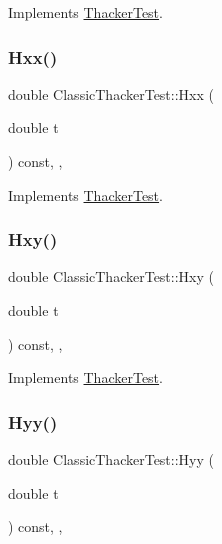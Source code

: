 Implements \hyperlink{classThackerTest_a9a8565b3a9e9bf1e56407d2844bd8517}{Thacker\+Test}.

\mbox{\label{classClassicThackerTest_a5c802e8ef039c0620dc2908987c9097e}} 
\subsubsection{\texorpdfstring{Hxx()}{Hxx()}}
{\footnotesize\ttfamily double Classic\+Thacker\+Test\+::\+Hxx (\begin{DoxyParamCaption}\item[{double}]{t }\end{DoxyParamCaption}) const\hspace{0.3cm}{\ttfamily [inline]}, {\ttfamily [override]}, {\ttfamily [virtual]}}



Implements \hyperlink{classThackerTest_a137a136dd1261b4a97a63831841d611b}{Thacker\+Test}.

\mbox{\label{classClassicThackerTest_adc43007df549bdb1d2ac940199740157}} 
\subsubsection{\texorpdfstring{Hxy()}{Hxy()}}
{\footnotesize\ttfamily double Classic\+Thacker\+Test\+::\+Hxy (\begin{DoxyParamCaption}\item[{double}]{t }\end{DoxyParamCaption}) const\hspace{0.3cm}{\ttfamily [inline]}, {\ttfamily [override]}, {\ttfamily [virtual]}}



Implements \hyperlink{classThackerTest_a309f6008f53c7084163ce52cd381efc7}{Thacker\+Test}.

\mbox{\label{classClassicThackerTest_a6c632dcd0ae4f38dd2e9e69282281df5}} 
\subsubsection{\texorpdfstring{Hyy()}{Hyy()}}
{\footnotesize\ttfamily double Classic\+Thacker\+Test\+::\+Hyy (\begin{DoxyParamCaption}\item[{double}]{t }\end{DoxyParamCaption}) const\hspace{0.3cm}{\ttfamily [inline]}, {\ttfamily [override]}, {\ttfamily [virtual]}}



